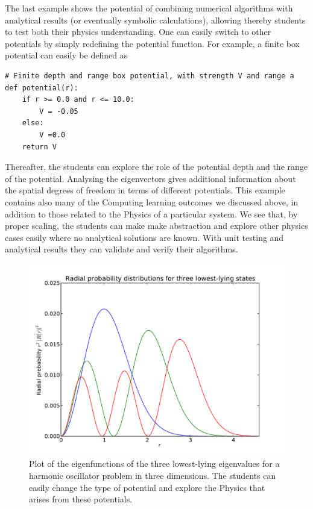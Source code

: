 \documentclass[graybox,envcountchap,sectrefs]{svmult}
\begin{document}
The last example shows the potential of combining numerical algorithms with analytical results (or eventually symbolic calculations), allowing thereby students to test both their physics understanding. One can easily switch to other potentials by simply redefining the potential function. For example, a finite box potential can easily be defined as  
\begin{lstlisting}
# Finite depth and range box potential, with strength V and range a
def potential(r):
    if r >= 0.0 and r <= 10.0:
        V = -0.05
    else:
        V =0.0
    return V
\end{lstlisting}
Thereafter, the students can explore the role of the potential depth
and the range of the potential. Analysing the eigenvectors gives
additional information about the spatial degrees of freedom in terms
of different potentials.  This example contains also many of the
Computing learning outcomes we discussed above, in addition to those
related to the Physics of a particular system. We see that, by proper
scaling, the students can make make abstraction and explore other
physics cases easily where no analytical solutions are known. With
unit testing and analytical results they can validate and verify their
algorithms.
\begin{figure}
\includegraphics[scale=0.8]{Figures/eigenvector.pdf}
\caption{Plot of the eigenfunctions of the three lowest-lying eigenvalues for a harmonic oscillator problem in three dimensions. The students can easily change the type of potential and explore the Physics that arises from these potentials.}
\end{figure}
\end{document}

